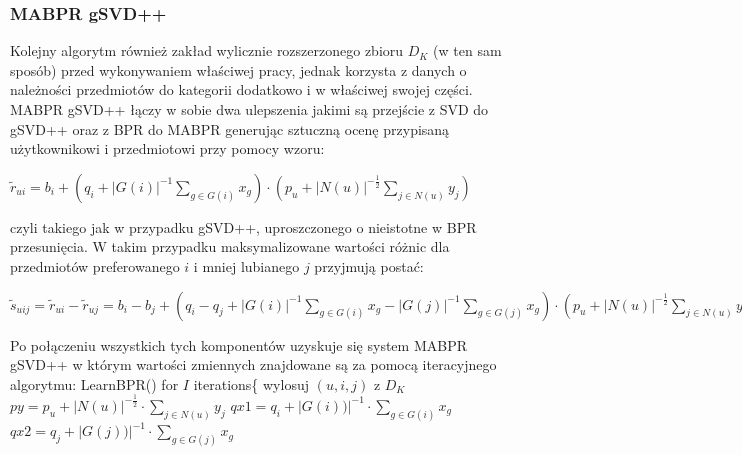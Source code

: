\documentclass{pracamgr}
\begin{document}
    \subsubsection{MABPR gSVD++}
     Kolejny algorytm również zakład wylicznie rozszerzonego zbioru $D_K$ (w ten sam sposób) przed wykonywaniem właściwej pracy,
     jednak korzysta z danych o należności przedmiotów do kategorii dodatkowo i w właściwej swojej części.
     MABPR gSVD++ łączy w sobie dwa ulepszenia jakimi są przejście z SVD do gSVD++ oraz z BPR do MABPR generując sztuczną ocenę przypisaną
     użytkownikowi i przedmiotowi przy pomocy wzoru:
     \begin{center}
       $\tilde{r}_{ui}=b_i+\left(q_i+|G(i)|^{-1}\sum\limits_{g\in G(i)}x_{g}\right)\cdot\left(p_u +|N(u)|^{-\frac{1}{2}}\sum\limits_{j\in N(u)}y_j\right)$
     \end{center}
     czyli takiego jak w przypadku gSVD++, uproszczonego o nieistotne w BPR przesunięcia.
     W takim przypadku maksymalizowane wartości różnic dla przedmiotów preferowanego $i$ i mniej lubianego $j$ przyjmują postać:
     \begin{center}
      $\tilde{s}_{uij}=\tilde{r}_{ui}-\tilde{r}_{uj}=b_i-b_j+
      \left(q_i-q_j+|G(i)|^{-1}\sum\limits_{g\in G(i)}x_{g}-|G(j)|^{-1}\sum\limits_{g\in G(j)}x_{g}\right)
      \cdot\left(p_u +|N(u)|^{-\frac{1}{2}}\sum\limits_{j\in N(u)}y_j\right)$
     \end{center}
     Po połączeniu wszystkich tych komponentów uzyskuje się system MABPR gSVD++ w którym wartości zmiennych znajdowane są za pomocą iteracyjnego algorytmu:\newline
     \hspace*{16pt}	LearnBPR()\newline
     \hspace*{16pt}	for $I$ iterations\{\newline
     \hspace*{32pt}		wylosuj $(u,i,j)$ z $D_K$\newline 
     \hspace*{32pt}		$py=p_u +|N(u)|^{-\frac{1}{2}}\cdot\sum\limits_{j\in N(u)}y_j$\newline
     \hspace*{32pt}		$qx1=q_i +|G(i))|^{-1}\cdot\sum\limits_{g\in G(i)}x_g$\newline
     \hspace*{32pt}		$qx2=q_j +|G(j))|^{-1}\cdot\sum\limits_{g\in G(j)}x_g$\newline
\end{document}
